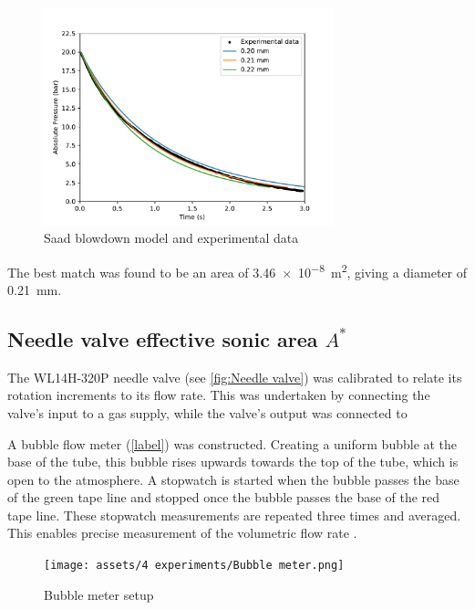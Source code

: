             \begin{figure}[!ht]
                \centering
                \includegraphics[width=0.75\textwidth]{assets/4 experiments/Saad blowdown fit.pdf}
                \caption{Saad blowdown model and experimental data}
            \end{figure}

            The best match was found to be an area of \qty{3.46e-8}{m^2}, giving a diameter of \qty{0.21}{mm}.

        \subsection{Needle valve effective sonic area $A^*$}

            The WL14H-320P needle valve (see \autoref{fig:Needle valve}) was calibrated to relate its rotation increments to its flow rate. This was undertaken by connecting the valve's input to a gas supply, while the valve's output was connected to 

            A bubble flow meter (\autoref{label}) was constructed. Creating a uniform bubble at the base of the tube, this bubble rises upwards towards the top of the tube, which is open to the atmosphere. A stopwatch is started when the bubble passes the base of the green tape line and stopped once the bubble passes the base of the red tape line. These stopwatch measurements are repeated three times and averaged. This enables precise measurement of the volumetric flow rate .

            \begin{figure}[!ht]
                \centering
                \texttt{[image: assets/4 experiments/Bubble meter.png]}
                \caption{Bubble meter setup}
                \label{bubble meter}
            \end{figure}

